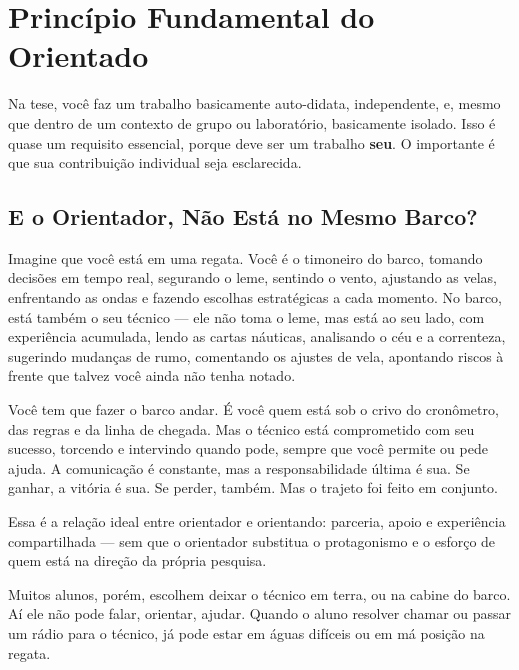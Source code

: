 \chapter{Princípio Fundamental do Orientado}
\label{chap:pfo}



Na tese, você faz um trabalho basicamente auto-didata, independente, e, mesmo que dentro de um contexto de grupo ou laboratório, basicamente isolado. Isso é quase um requisito essencial, porque deve ser um trabalho \textbf{seu}. O importante é que sua contribuição individual seja esclarecida.




\section{E o Orientador, Não Está no Mesmo Barco?}

Imagine que você está em uma regata. Você é o timoneiro do barco, tomando decisões em tempo real, segurando o leme, sentindo o vento, ajustando as velas, enfrentando as ondas e fazendo escolhas estratégicas a cada momento. 
No barco, está também o seu técnico — ele não toma o leme, mas está ao seu lado, com experiência acumulada, lendo as cartas náuticas, analisando o céu e a correnteza, sugerindo mudanças de rumo, comentando os ajustes de vela, apontando riscos à frente que talvez você ainda não tenha notado.

Você tem que fazer o barco andar. É você quem está sob o crivo do cronômetro, das regras e da linha de chegada. 
Mas o técnico está comprometido com seu sucesso, torcendo e intervindo quando pode, sempre que você permite ou pede ajuda. A comunicação é constante, mas a responsabilidade última é sua. Se ganhar, a vitória é sua. Se perder, também. Mas o trajeto foi feito em conjunto.

Essa é a relação ideal entre orientador e orientando: parceria, apoio e experiência compartilhada — sem que o orientador substitua o protagonismo e o esforço de quem está na direção da própria pesquisa.

Muitos alunos, porém, escolhem deixar o técnico em terra, ou na cabine do barco. Aí ele não pode falar, orientar, ajudar. Quando o aluno resolver chamar ou passar um rádio para o técnico, já pode estar em águas difíceis ou em má posição na regata. 

